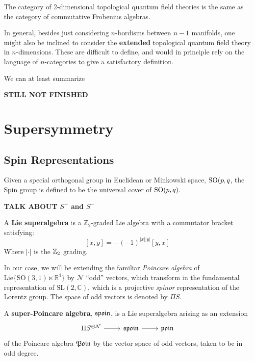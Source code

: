 	\begin{theorem}
		The category of 2-dimensional topological quantum field theories is the same as the category of commutative Frobenius algebras.
	\end{theorem}
	
	In general, besides just considering $n$-bordisms between $n-1$ manifolds, one might also be inclined to consider the  \textbf{extended} topological quantum field theory in $n$-dimensions.
	These are difficult to define, and would in principle rely on the language of $n$-categories to give a satisfactory definition. 
	
	We can at least summarize 
	
	\textbf{STILL NOT FINISHED}
	

	\section{Supersymmetry} %
	\label{sec:supersymmetry}
	\subsection{Spin Representations} %
	\label{sub:spin_representations}

		Given a special orthogonal group in Euclidean or Minkowski space, $\mathrm{SO}(p, q$, the Spin group is defined to be the universal cover of $\mathrm{SO}(p, q)$.
		
		\textbf{TALK ABOUT $S^+$ and $S^-$}


	\begin{defn}
	A \textbf{Lie superalgebra} is a $\mathbb Z_2$-graded Lie algebra with a commutator bracket satisfying:
		$$[x, y]= -(-1)^{|x||y|} [y, x]$$
	Where $|\cdot|$ is the $\mathbb{Z}_2$ grading.
	\end{defn}
	In our case, we will be extending the familiar \emph{Poincare algebra} of $\mathrm{Lie}\{ \mathrm{SO}(3, 1) \ltimes \mathbb R^4  \}$ by $\mathcal N$ ``odd'' vectors, which transform in the fundamental representation of $\mathrm{SL(2, \mathbb C)}$, which is a projective \emph{spinor} representation of the Lorentz group. The space of odd vectors is denoted by $\Pi S$.
	\begin{defn}
		A \textbf{super-Poincare algebra}, $\frak{spoin}$, is a Lie superalgebra arising as an extension
		\[
			\begin{tikzcd}
				\Pi S^{\oplus \mathcal N} \arrow[r] & \frak{spoin} \arrow[r] & \frak{poin}
			\end{tikzcd}
		\]
		of the Poincare algebra $\frak{Poin}$ by the vector space of odd vectors, taken to be in odd degree.
	\end{defn}
	
